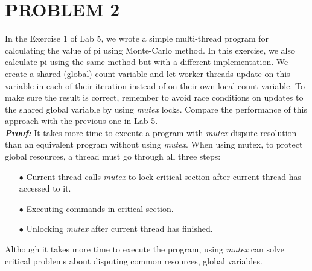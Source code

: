 \documentclass[13pt,a4paper]{article}
\begin{document}
	\section{PROBLEM 2}
		In the Exercise 1 of Lab 5, we wrote a simple multi-thread program for calculating the value of pi using Monte-Carlo method. In this exercise, we also calculate pi using the same method but with a different implementation. We create a shared (global) count variable and let worker threads update on this variable in each of their iteration instead of on their own local count variable. To make sure the result is correct, remember to avoid race conditions on updates to the shared global variable by using \textit{mutex} locks. Compare the performance of this approach with the previous one in Lab 5.
		\\
		\textit{\underline{\textbf{Proof:}}}
		\newline
		It takes more time to execute a program with \textit{mutex} dispute resolution than an equivalent program without using \textit{mutex}. When using mutex, to protect global resources, a thread must go through all three steps:
		\begin{itemize}
			\item[$\bullet$] Current thread calls \textit{mutex} to lock critical section after current thread has accessed to it.
			\item[$\bullet$] Executing commands in critical section.
			\item[$\bullet$] Unlocking \textit{mutex} after current thread has finished.
		\end{itemize}
		Although it takes more time to execute the program, using \textit{mutex} can solve critical problems about disputing common resources, global variables. 
\end{document}
